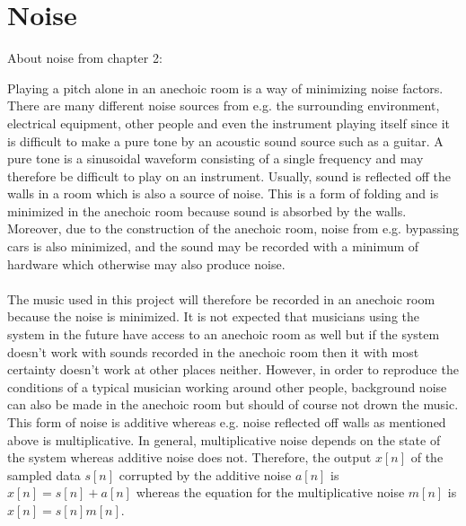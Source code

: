 \section{Noise}
About noise from chapter 2: \textregistered

Playing a pitch alone in an anechoic room is a way of minimizing noise factors. There are many different noise sources from e.g. the surrounding environment, electrical equipment, other people and even the instrument playing itself since it is difficult to make a pure tone by an acoustic sound source such as a guitar. A pure tone is a sinusoidal waveform consisting of a single frequency and may therefore be difficult to play on an instrument. \cite{AcousticNoise} Usually, sound is reflected off the walls in a room which is also a source of noise. This is a form of folding and is minimized in the anechoic room because sound is absorbed by the walls. Moreover, due to the construction of the anechoic room, noise from e.g. bypassing cars is also minimized, and the sound may be recorded with a minimum of hardware which otherwise may also produce noise.
\\ \\
The music used in this project will therefore be recorded in an anechoic room because the noise is minimized. It is not expected that musicians using the system in the future have access to an anechoic room as well but if the system doesn't work with sounds recorded in the anechoic room then it with most certainty doesn't work at other places neither. However, in order to reproduce the conditions of a typical musician working around other people, background noise can also be made in the anechoic room but should of course not drown the music. This form of noise is additive whereas e.g. noise reflected off walls as mentioned above is multiplicative. In general, multiplicative noise depends on the state of the system whereas additive noise does not. Therefore, the output $x[n]$ of the sampled data $s[n]$ corrupted by the additive noise $a[n]$ is $x[n] = s[n] + a[n]$ whereas the equation for the multiplicative noise $m[n]$ is $x[n] = s[n]m[n]$.